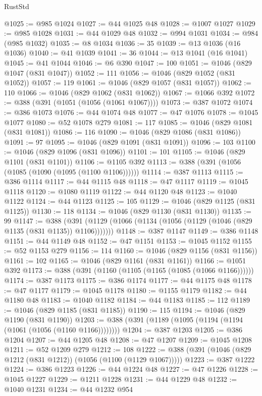\begin{lexlean}{RustStd}
\begin{coremodule}
@1025 := @985 @1024
@1027 := @44 @1025 @48
@1028 := @1007 @1027
@1029 := @985 @1028
@1031 := @44 @1029 @48
@1032 := @994 @1031
@1034 := @984 (@985 @1032)
@1035 := @8 @1034
@1036 := 35
@1039 := @13 @1036 (@16 @1036)
@1040 := @41 @1039
@1041 := 36
@1044 := @13 @1041 (@16 @1041)
@1045 := @41 @1044
@1046 := @6 @390
@1047 := 100
@1051 := @1046 (@829 @1047 (@831 @1047))
@1052 := 111
@1056 := @1046 (@829 @1052 (@831 @1052))
@1057 := 119
@1061 := @1046 (@829 @1057 (@831 @1057))
@1062 := 110
@1066 := @1046 (@829 @1062 (@831 @1062))
@1067 := @1066 @392
@1072 := @388 (@391 (@1051 (@1056 (@1061 @1067))))
@1073 := @387 @1072
@1074 := @386 @1073
@1076 := @44 @1074 @48
@1077 := @47 @1076
@1078 := @1045 @1077
@1080 := @52 @1078 @279
@1081 := 117
@1085 := @1046 (@829 @1081 (@831 @1081))
@1086 := 116
@1090 := @1046 (@829 @1086 (@831 @1086))
@1091 := 97
@1095 := @1046 (@829 @1091 (@831 @1091))
@1096 := 103
@1100 := @1046 (@829 @1096 (@831 @1096))
@1101 := 101
@1105 := @1046 (@829 @1101 (@831 @1101))
@1106 := @1105 @392
@1113 := @388 (@391 (@1056 (@1085 (@1090 (@1095 (@1100 @1106))))))
@1114 := @387 @1113
@1115 := @386 @1114
@1117 := @44 @1115 @48
@1118 := @47 @1117
@1119 := @1045 @1118
@1120 := @1080 @1119
@1122 := @44 @1120 @48
@1123 := @1040 @1122
@1124 := @44 @1123
@1125 := 105
@1129 := @1046 (@829 @1125 (@831 @1125))
@1130 := 118
@1134 := @1046 (@829 @1130 (@831 @1130))
@1135 := 99
@1147 := @388 (@391 (@1129 (@1066 (@1134 (@1056 (@1129 (@1046 (@829 @1135 (@831 @1135)) @1106)))))))
@1148 := @387 @1147
@1149 := @386 @1148
@1151 := @44 @1149 @48
@1152 := @47 @1151
@1153 := @1045 @1152
@1155 := @52 @1153 @279
@1156 := 114
@1160 := @1046 (@829 @1156 (@831 @1156))
@1161 := 102
@1165 := @1046 (@829 @1161 (@831 @1161))
@1166 := @1051 @392
@1173 := @388 (@391 (@1160 (@1105 (@1165 (@1085 (@1066 @1166))))))
@1174 := @387 @1173
@1175 := @386 @1174
@1177 := @44 @1175 @48
@1178 := @47 @1177
@1179 := @1045 @1178
@1180 := @1155 @1179
@1182 := @44 @1180 @48
@1183 := @1040 @1182
@1184 := @44 @1183
@1185 := 112
@1189 := @1046 (@829 @1185 (@831 @1185))
@1190 := 115
@1194 := @1046 (@829 @1190 (@831 @1190))
@1203 := @388 (@391 (@1189 (@1095 (@1194 (@1194 (@1061 (@1056 (@1160 @1166))))))))
@1204 := @387 @1203
@1205 := @386 @1204
@1207 := @44 @1205 @48
@1208 := @47 @1207
@1209 := @1045 @1208
@1211 := @52 @1209 @279
@1212 := 108
@1222 := @388 (@391 (@1046 (@829 @1212 (@831 @1212)) (@1056 (@1100 (@1129 @1067)))))
@1223 := @387 @1222
@1224 := @386 @1223
@1226 := @44 @1224 @48
@1227 := @47 @1226
@1228 := @1045 @1227
@1229 := @1211 @1228
@1231 := @44 @1229 @48
@1232 := @1040 @1231
@1234 := @44 @1232 @954

\end{coremodule}
\end{lexlean}
